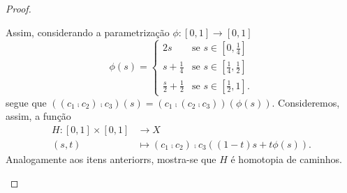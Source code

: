 \begin{proof}
\begin{enumerate}
	Assim, considerando a parametrização $\phi: [0,1] \to [0,1]$
	\begin{equation*}
	\phi(s)
		=
			\begin{cases}
				2s &\text{se $s \in [0,\frac{1}{4}]$} \\
				s + \frac{1}{4} &\text{se $s \in [\frac{1}{4},\frac{1}{2}]$} \\
				\frac{s}{2}+\frac{1}{2} &\text{se $s \in [\frac{1}{2},1]$}.
			\end{cases}
	\end{equation*}	
segue que $((c_1 \comp c_2) \comp c_3)(s) = (c_1 \comp (c_2 \comp c_3)) (\phi(s))$. Consideremos, assim, a função
	\begin{align*}
	H: [0,1] \times [0,1] &\to X \\
		(s,t) &\mapsto (c_1 \comp c_2) \comp c_3 ((1-t)s + t \phi(s)).
	\end{align*}
	Analogamente aos itens anteriorrs, mostra-se que $H$ é homotopia de caminhos.
	\end{enumerate}
\end{proof}


